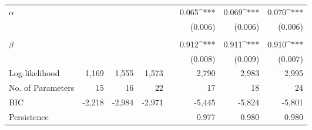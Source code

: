 \begin{table}[!ht]
\begin{tabularx}{\textwidth}{@{}l ddd X ddd @{}}
    $\alpha$ & & & && 0.065^{***} & 0.069^{***} & 0.070^{***} \\
    & & & && (0.006) & (0.006) & (0.006) \\
    \\
    $\beta$ & & & && 0.912^{***} & 0.911^{***} & 0.910^{***} \\
    & & & && (0.008) & (0.009) & (0.007) \\
    \midrule
    Log-likelihood & 1,169 & 1,555 & 1,573 && 2,790 & 2,983 & 2,995 \\
    No. of Parameters & 15 & 16 & 22 && 17 & 18 & 24 \\
    BIC & -2,218 & -2,984 & -2,971 && -5,445 & -5,824 & -5,801 \\
    Persistence & & & && 0.977 & 0.980 & 0.980 \\
    \bottomrule
  \end{tabularx}

  \label{tab:copula_estimation}
\end{table}
